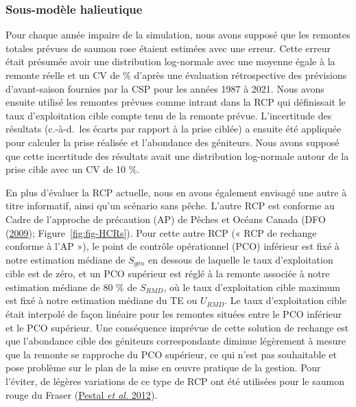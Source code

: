 \documentclass[french,11pt]{book}
\begin{document}
\hypertarget{sous-moduxe8le-halieutique}{%
\subsubsection{Sous-modèle halieutique}\label{sous-moduxe8le-halieutique}}

Pour chaque année impaire de la simulation, nous avons supposé que les remontes totales prévues de saumon rose étaient estimées avec une erreur. Cette erreur était présumée avoir une distribution log-normale avec une moyenne égale à la remonte réelle et un CV de  \% d'après une évaluation rétrospective des prévisions d'avant-saison fournies par la CSP pour les années 1987 à 2021. Nous avons ensuite utilisé les remontes prévues comme intrant dans la RCP qui définissait le taux d'exploitation cible compte tenu de la remonte prévue. L'incertitude des résultats (c.-à-d.~les écarts par rapport à la prise ciblée) a ensuite été appliquée pour calculer la prise réalisée et l'abondance des géniteurs. Nous avons supposé que cette incertitude des résultats avait une distribution log-normale autour de la prise cible avec un CV de 10 \%.

En plus d'évaluer la RCP actuelle, nous en avons également envisagé une autre à titre informatif, ainsi qu'un scénario sans pêche. L'autre RCP est conforme au Cadre de l'approche de précaution (AP) de Pêches et Océans Canada (DFO (\protect\hyperlink{ref-dfoFisheryDecisionmakingFramework2009}{2009}); Figure~\ref{fig:fig-HCRs}). Pour cette autre RCP (« RCP de rechange conforme à l'AP »), le point de contrôle opérationnel (PCO) inférieur est fixé à notre estimation médiane de \(S_{gén}\) en dessous de laquelle le taux d'exploitation cible est de zéro, et un PCO supérieur est réglé à la remonte associée à notre estimation médiane de 80 \% de \(S_{RMD}\), où le taux d'exploitation cible maximum est fixé à notre estimation médiane du TE ou \(U_{RMD}\). Le taux d'exploitation cible était interpolé de façon linéaire pour les remontes situées entre le PCO inférieur et le PCO supérieur. Une conséquence imprévue de cette solution de rechange est que l'abondance cible des géniteurs correspondante diminue légèrement à mesure que la remonte se rapproche du PCO supérieur, ce qui n'est pas souhaitable et pose problème sur le plan de la mise en œuvre pratique de la gestion. Pour l'éviter, de légères variations de ce type de RCP ont été utilisées pour le saumon rouge du Fraser (\protect\hyperlink{ref-pestalUpdatedMethodsAssessing2012}{Pestal \emph{et al.} 2012}).
\end{document}

